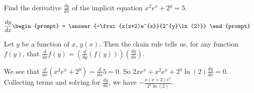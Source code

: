 \documentclass{ximera}
\author{Gregory Hartman \and Matthew Carr}
\begin{document}
\begin{exercise}




Find the derivative $\frac{dy}{dx}$ of the implicit equation $x^2e^{x}+2^y=5$.

\[
\frac{dy}{dx}
\begin{prompt}
= \answer{-\frac{x(x+2)e^{x}}{2^{y}\ln(2)}}
\end{prompt}
\]

\begin{hint}
Let $y$ be a function of $x$, $y(x)$. Then the chain rule tells us, for any function $f(y)$, that $\frac{d}{dx}f(y)=\left(\frac{d}{dy}\left(f(y)\right)\right)\left(\frac{dy}{dx}\right)$. 
\end{hint}
\begin{hint}
We see that $\frac{d}{dx}(x^2e^x+2^y)=\frac{d}{dx}5=0$. So $2xe^x+x^2e^x+2^y\ln(2)\frac{dy}{dx}=0$. Collecting terms and solving for $\frac{dy}{dx}$, we have $-\frac{x(x+2)e^x}{2^{y}\ln(2)}$.
\end{hint}

\end{exercise}
\end{document}
